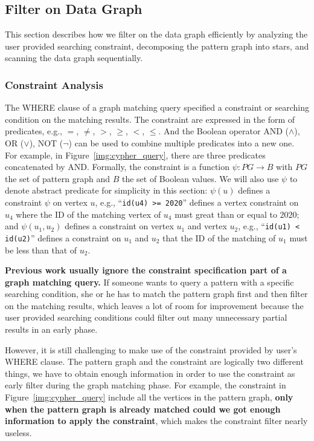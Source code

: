 \subsection{Filter on Data Graph}\label{sec:filter_on_data_graph}
This section describes how we filter on the data graph efficiently by analyzing the user provided searching constraint,
decomposing the pattern graph into stars, and scanning the data graph sequentially.
\subsubsection{Constraint Analysis}\label{sec:constraint_analysis}
The WHERE clause of a graph matching query specified a constraint or searching condition on the matching results.
The constraint are expressed in the form of predicates, e.g., $=$, $\neq$, $>$, $\ge$, $<$, $\le$.
And the Boolean operator AND ($\land$), OR ($\lor$), NOT ($\lnot$) can be used to combine multiple predicates into a new one.
For example, in Figure~\ref{img:cypher_query}, there are three predicates concatenated by AND\@.
Formally, the constraint is a function $\psi: PG \rightarrow B$ with $PG$ the set of pattern graph and $B$ the set of Boolean values.
We will also use $\psi$ to denote abstract predicate for simplicity in this section:
$\psi(u)$ defines a constraint $\psi$ on vertex $u$, e.g., ``\texttt{id(u4) >= 2020}'' defines a vertex constraint on $u_4$ where the ID of the matching vertex of $u_4$ must great than or equal to $2020$;
and $\psi(u_1, u_2)$ defines a constraint on vertex $u_1$ and vertex $u_2$,
e.g., ``\texttt{id(u1) < id(u2)}'' defines a constraint on $u_1$ and $u_2$ that the ID of the matching of $u_1$ must be less than that of $u_2$.

\textbf{Previous work usually ignore the constraint specification part of a graph matching query.}
If someone wants to query a pattern with a specific searching condition,
she or he has to match the pattern graph first and then filter on the matching results,
which leaves a lot of room for improvement because the user provided searching conditions could filter out many unnecessary
partial results in an early phase.

However, it is still challenging to make use of the constraint provided by user's WHERE clause.
The pattern graph and the constraint are logically two different things,
we have to obtain enough information in order to use the constraint as early filter during the graph matching phase.
For example, the constraint in Figure~\ref{img:cypher_query} include all the vertices in the pattern graph,
\textbf{only when the pattern graph is already matched could we got enough information to apply the constraint},
which makes the constraint filter nearly useless.

